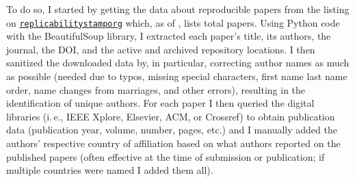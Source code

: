 \documentclass[conference]{vgtc}                     %
\newcommand{\ie}{i.\,e.}
\begin{document}
To do so, I started by getting the data about reproducible papers from the listing on \href{https://www.replicabilitystamp.org/}{\texttt{replicabilitystamporg}} which, as of \GrsiDataCurrentAsOf, lists \GrsiTotalPapers{} total papers. Using Python code with the BeautifulSoup library, I extracted each paper's title, its authors, the journal, the DOI, and the active and archived repository locations. I then sanitized the downloaded data by, in particular, correcting author names as much as possible (needed due to typos, missing special characters, first name last name order, name changes from marriages, and other errors), resulting in the identification of \GrsiTotalAuthors{} unique authors. For each paper I then queried the digital libraries (\ie, IEEE Xplore, Elsevier, ACM, or Crossref) to obtain publication data (publication year, volume, number, pages, etc.) and I manually added the authors' respective country of affiliation based on what authors reported on the published papers (often effective at the time of submission or publication; if multiple countries were named I added them all).
\end{document}
